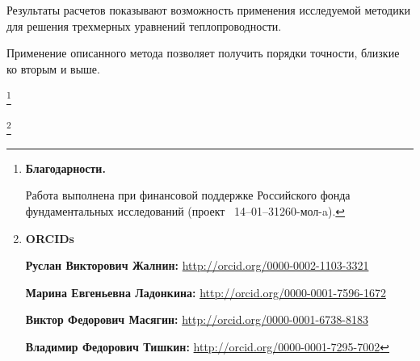
Результаты расчетов показывают возможность применения исследуемой методики для решения трехмерных уравнений теплопроводности. 

Применение описанного метода позволяет получить порядки точности, близкие ко вторым и выше.



\thanks{\textbf{Благодарности.} 

Работа выполнена при финансовой поддержке Российского фонда фундаментальных исследований (проект \No~14--01--31260-мол-a). 

}



\thanks{{\bf ORCIDs}



{\bf Руслан Викторович Жалнин:}    \url{http://orcid.org/0000-0002-1103-3321}



{\bf Марина Евгеньевна Ладонкина:} \url{http://orcid.org/0000-0001-7596-1672}



{\bf Виктор Федорович Масягин:} \url{http://orcid.org/0000-0001-6738-8183}



{\bf Владимир Федорович Тишкин:} \url{http://orcid.org/0000-0001-7295-7002}





}



\RusRef



\newpage



\renewcommand{\baselinestretch}{0.82}



